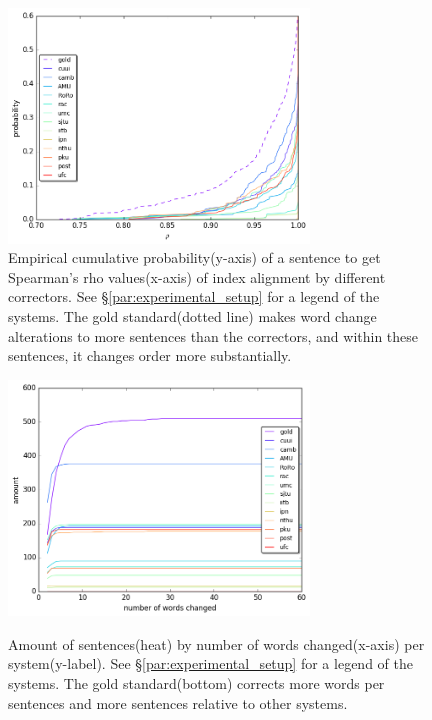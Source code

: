 \documentclass[english]{article}
\begin{document}
\begin{figure}
	\includegraphics[width = 8cm]{spearman_ecdf}
		\caption{Empirical cumulative probability(y-axis) of a sentence to get Spearman's rho values(x-axis) of index alignment by different correctors. See \S\ref{par:experimental_setup} for a legend
		of the systems.
          The gold standard(dotted line) makes word change alterations to more sentences than the correctors,
          and within these sentences, it changes order more substantially.}
	\label{fig:rho}
\end{figure}

\begin{figure}
	\includegraphics[width = 8cm]{words_differences}
	\label{fig:words_changed}
        \caption{Amount of sentences(heat) by number of words 
        	changed(x-axis) per system(y-label). See \S\ref{par:experimental_setup} for a legend
        	of the systems. The gold standard(bottom) corrects more words per sentences and more sentences relative to other systems.}
\end{figure}
\end{document}
